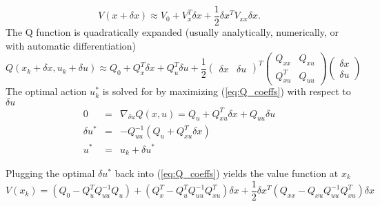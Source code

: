 \documentclass[10 pt]{article}
\begin{document}
\begin{equation}
V(x+\delta x) \approx V_0 + V_x^T\delta x + \frac{1}{2}\delta x^T V_{xx} \delta x.
\end{equation}
The Q function is quadratically expanded (usually analytically, numerically, or with automatic differentiation)
\begin{equation}
\label{eq:Q_coeffs}
Q(x_k+\delta x,u_k+\delta u) \approx Q_0 +Q_x^T\delta x +Q_u^T\delta u+
\frac{1}{2}
(\begin{array}{rr}\delta x & \delta u\end{array})^T
\left(\begin{array}{rr}Q_{xx} & Q_{xu}\\Q_{xu}^T & Q_{uu}\end{array}\right)
\left(\begin{array}{rr}\delta x \\ \delta u\end{array}\right)
\end{equation}
The optimal action $u_k^*$ is solved for by maximizing (\ref{eq:Q_coeffs}) with respect to $\delta u$
\begin{eqnarray*}
0 &=& \nabla_{\delta u}Q(x,u) = Q_u + Q_{xu}^T\delta x + Q_{uu}\delta u\\
\delta u^* &=& -Q_{uu}^{-1}(Q_u+Q_{xu}^T\delta x)\\
u^* &=& u_k + \delta u^*
\end{eqnarray*}

Plugging the optimal $\delta u^*$ back into (\ref{eq:Q_coeffs}) yields the value function at $x_k$
\[
V(x_k)=\left(Q_0-Q_u^TQ_{uu}^{-1}Q_u\right)+\left(Q_x^T-Q_u^TQ_{uu}^{-1}Q_{xu}^T\right)\delta x+\frac{1}{2}\delta x^T\left(Q_{xx}-Q_{xu}Q_{uu}^{-1}Q_{xu}^T\right)\delta x
\]
\end{document}
